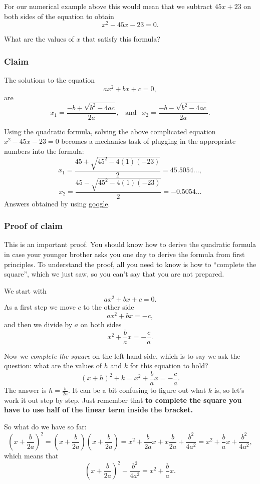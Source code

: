 \documentclass[journal]{IEEEtran}
\newcommand{\dokutitlelevelfour}[1]{\subsubsection{#1}}
\newcommand{\dokubold}[1]{\textbf{#1}}
\newcommand{\dokuitalic}[1]{\textsl{#1}}
\begin{document}
For our numerical example above this would mean that we subtract 
\(45x+23\) on both sides of the equation to obtain
\[
  x^2 - 45x - 23 = 0.
\]

What are the values of \(x\) that satisfy this formula?


\dokutitlelevelfour{Claim}

The solutions to the equation 
\[
  ax^2 + bx + c = 0,
\]
are
\[
   x_1 = \frac{-b + \sqrt{b^2-4ac} }{2a}, \ \ \text{  and  }
 \ \ x_2 = \frac{-b - \sqrt{b^2-4ac} }{2a}.
\]


Using the quadratic formula, solving the above complicated
equation \(x^2 - 45x - 23 = 0\) becomes a mechanics task of plugging
in the appropriate numbers into the formula:
\[
  x_1 = \frac{45 + \sqrt{45^2-4(1)(-23)} }{2} = 45.5054\ldots,
\]
\[
  x_2 = \frac{45 - \sqrt{45^2-4(1)(-23)} }{2} = -0.5054\ldots
\]
Answers obtained by using \href{http://www.google.ca/search?hl=en&client=safari&rls=en&q=%28++45+%2B+sqrt%2845%5E2-4%281%29%28-23%29%29++++%29%2F2&aq=f&aqi=&aql=&oq=&gs_rfai=}{google}.


\dokutitlelevelfour{Proof of claim}

This is an important proof. You should know how to derive the quadratic
formula in case your younger brother asks you one day 
to derive the formula from first principles.
To understand the proof, all you need to know is
how to ``complete the square'',
which we just saw, so you can't say that you are not prepared.


We start with
\[
  ax^2 + bx + c = 0.
\]
As a first step we move \(c\) to the other side
\[
  ax^2 + bx  = -c,
\]
and then we divide by \(a\) on both sides
\[
  x^2 + \frac{b}{a}x  = -\frac{c}{a}.
\]

Now we \dokuitalic{complete the square} on the left hand side, 
which is to say we ask the question: what are the values of \(h\) and \(k\)
for this equation to hold?
\[
  (x+h)^2 + k = x^2 + \frac{b}{a}x = -\frac{c}{a}.
\]
The answer is \(h = \frac{b}{2a}\).
It can be a bit confusing to figure out what \(k\) is, so let's
work it out step by step.
Just remember that \dokubold{to complete the square you 
have to use half of the linear term inside the bracket.}

So what do we have so far:
\[
  \left(x + \frac{b}{2a} \right)^2
= \left(x + \frac{b}{2a} \right)\!\!\left(x + \frac{b}{2a} \right)
= x^2 + \frac{b}{2a}x + x\frac{b}{2a} + \frac{b^2}{4a^2}  = x^2 + \frac{b}{a}x + \frac{b^2}{4a^2},
\]
which means that 
\[
  \left(x + \frac{b}{2a} \right)^2 - \frac{b^2}{4a^2}  = x^2 + \frac{b}{a}x.
\]
\end{document}
